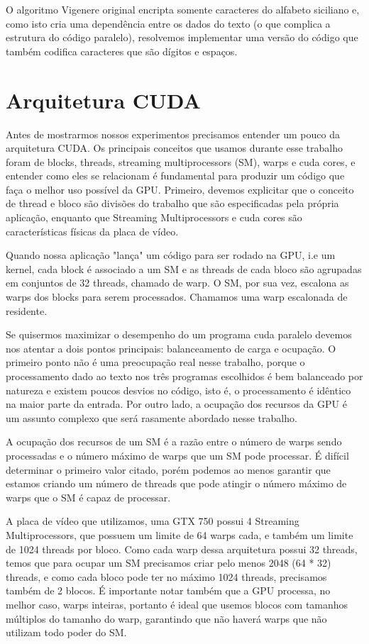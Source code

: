 \documentclass[12pt]{article}
\begin{document}
O algoritmo Vigenere original encripta somente caracteres do alfabeto
siciliano e, como isto cria uma dependência entre os dados do texto
(o que complica a estrutura do código paralelo), resolvemos implementar 
uma versão do código que também codifica caracteres que são dígitos 
e espaços.


\newpage
\section{Arquitetura CUDA}
Antes de mostrarmos nossos experimentos precisamos entender um pouco da
arquitetura CUDA. Os principais conceitos que usamos durante esse 
trabalho foram de blocks, threads, streaming multiprocessors (SM), warps
e cuda cores, e entender como eles se relacionam é fundamental para
produzir um código que faça o melhor uso possível da GPU. Primeiro,
devemos explicitar que o conceito de thread e bloco são divisões do 
trabalho que são especificadas pela própria aplicação, enquanto que
Streaming Multiprocessors e cuda cores são características físicas da
placa de vídeo. 

Quando nossa aplicação "lança" um código para ser rodado na GPU, i.e um 
kernel, cada block é associado a um SM e as threads de cada bloco
são agrupadas em conjuntos de 32 threads, chamado de warp. O SM, por sua
vez, escalona as warps dos blocks para serem processados. Chamamos uma
warp escalonada de residente.

Se quisermos maximizar o desempenho do um programa cuda paralelo devemos
nos atentar a dois pontos principais: balanceamento de carga e 
ocupação. O primeiro ponto não é uma preocupação real nesse trabalho, 
porque o processamento dado ao texto nos três programas escolhidos é bem
balanceado por natureza e existem poucos desvios no código, isto é, 
o processamento é idêntico na maior parte da entrada. Por outro lado, a
ocupação dos recursos da GPU é um assunto complexo que será rasamente
abordado nesse trabalho.

A ocupação dos recursos de um SM é a razão entre o número de warps sendo
processadas e o número máximo de warps que um SM pode processar. É 
difícil determinar o primeiro valor citado, porém podemos ao menos 
garantir que estamos criando um número de threads que pode atingir o 
número máximo de warps que o SM é capaz de processar. 

A placa de vídeo que utilizamos, uma GTX 750 possui 4 Streaming 
Multiprocessors, que possuem um limite de 64 warps cada, e também um 
limite de 1024 threads por bloco. Como cada warp dessa arquitetura
possui 32 threads, temos que para ocupar um SM precisamos criar pelo
menos 2048 (64 * 32) threads, e como cada bloco pode ter no máximo 1024
threads, precisamos também de 2 blocos. É importante notar também que a
GPU processa, no melhor caso, warps inteiras, portanto é ideal que 
usemos blocos com tamanhos múltiplos do tamanho do warp, garantindo que 
não haverá warps que não utilizam todo poder do SM.
\end{document}
